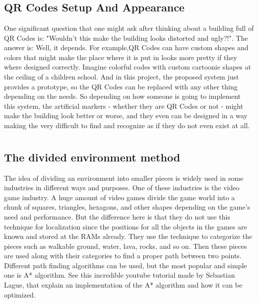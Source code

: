 \appendix %

\chapter{}
\section*{QR Codes Setup And Appearance}
\label{appendix:QR Codes Setup And Appearance}

One significant question that one might ask after thinking about a building full of QR Codes is: "Wouldn't this make the building looks distorted and ugly?!". The answer is: Well, it depends. For example,QR Codes can have custom shapes and colors that might make the place where it is put in looks more pretty if they where designed correctly. Imagine colorful codes with custom cartoonie shapes at the ceiling of a children school. And in this project, the proposed system just provides a prototype, so the QR Codes can be replaced with any other thing depending on the needs. So depending on how someone is going to implement this system, the artificial markers - whether they are QR Codes or not - might make the building look better or worse, and they even can be designed in a way making the very difficult to find and recognize as if they do not even exist at all.

\chapter{}
\section*{The divided environment method}
\label{appendix:The divided environment method}

The idea of dividing an environment into smaller pieces is widely used in
some industries in different ways and purposes. One of these industries is the video game industry. A huge amount of video games divide the game world
into a chunk of squares, triangles, hexagons, and other shapes depending on the
game’s need and performance. But the difference here is that they do not use
this technique for localization since the positions for all the objects in the games
are known and stored at the RAMs already. They use the technique to categorize
the pieces such as walkable ground, water, lava, rocks, and so on. Then these
pieces are used along with their categories to find a proper path between two
points. Different path finding algorithms can be used, but the most popular and
simple one is A* algorithm. See this \cite{SebastianLague_AStar} incredible youtube tutorial made by
Sebastian Lague, that explain an implementation of the A* algorithm and how
it can be optimized.

